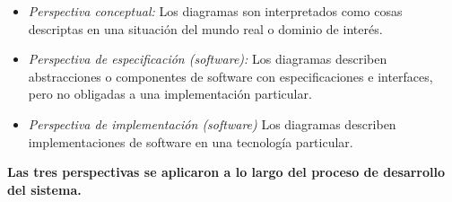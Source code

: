 \begin{itemize}
    \item \emph{Perspectiva conceptual:} Los diagramas son interpretados como cosas descriptas en una situación del mundo real o dominio de interés.
    \item \emph{Perspectiva de especificación (software):} Los diagramas describen abstracciones o componentes de software con especificaciones e interfaces, pero no obligadas a una implementación particular.
    \item \emph{Perspectiva de implementación (software)} Los diagramas describen implementaciones de software en una tecnología particular.
\end{itemize}

\textbf{Las tres perspectivas se aplicaron a lo largo del proceso de desarrollo del sistema.}

